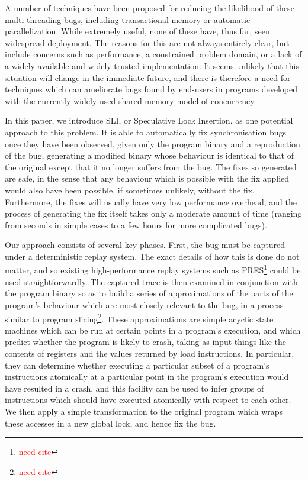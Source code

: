 \documentclass[10pt,twocolumn,preprint,natbib,authoryear]{sigplanconf}
\newcommand{\editorial}[1]{\textcolor{red}{\footnote{\textcolor{red}{#1}}}}
\newcommand{\needCite}{\editorial{need cite}}
\begin{document}
A number of techniques have been proposed for reducing the likelihood
of these multi-threading bugs, including transactional
memory\cite{Shavit1997} or automatic parallelization\cite{Bacon1994}.
While extremely useful, none of these have, thus far, seen widespread
deployment.  The reasons for this are not always entirely clear, but
include concerns such as performance, a constrained problem domain, or
a lack of a widely available and widely trusted implementation.  It
seems unlikely that this situation will change in the immediate
future, and there is therefore a need for techniques which can
ameliorate bugs found by end-users in programs developed with the
currently widely-used shared memory model of concurrency.

In this paper, we introduce SLI, or Speculative Lock Insertion, as one
potential approach to this problem.  It is able to automatically fix
synchronisation bugs once they have been observed, given only the
program binary and a reproduction of the bug, generating a modified
binary whose behaviour is identical to that of the original except
that it no longer suffers from the bug.  The fixes so generated are
safe, in the sense that any behaviour which is possible with the fix
applied would also have been possible, if sometimes unlikely, without
the fix.  Furthermore, the fixes will usually have very low
performance overhead, and the process of generating the fix itself
takes only a moderate amount of time (ranging from seconds in simple
cases to a few hours for more complicated bugs).

Our approach consists of several key phases.  First, the bug must be
captured under a deterministic replay system.  The exact details of
how this is done do not matter, and so existing high-performance
replay systems such as PRES\needCite{} could be used
straightforwardly.  The captured trace is then examined in conjunction
with the program binary so as to build a series of approximations of
the parts of the program's behaviour which are most closely relevant
to the bug, in a process similar to program slicing\needCite{}.  These
approximations are simple acyclic state machines which can be run at
certain points in a program's execution, and which predict whether the
program is likely to crash, taking as input things like the contents
of registers and the values returned by load instructions.  In
particular, they can determine whether executing a particular subset
of a program's instructions atomically at a particular point in the
program's execution would have resulted in a crash, and this facility
can be used to infer groups of instructions which should have executed
atomically with respect to each other.  We then apply a simple
transformation to the original program which wraps these accesses in a
new global lock, and hence fix the bug.
\end{document}
